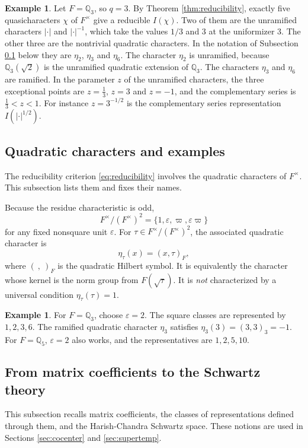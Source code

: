 \documentclass[12pt,letterpaper]{amsart}
\numberwithin{equation}{section}
\theoremstyle{definition}
\newtheorem{example}[theorem]{Example}
\newtheorem*{example*}{Example}
\theoremstyle{remark}
\begin{document}
\begin{example*}
Let $F=\mathbb Q_3$, so $q=3$. By Theorem \ref{thm:reducibility}, exactly five quasicharacters $\chi$ of $F^\times$ give a reducible $I(\chi)$. Two of them are the unramified characters $|\cdot|$ and $|\cdot|^{-1}$, which take the values $1/3$ and $3$ at the uniformizer $3$. The other three are the nontrivial quadratic characters. In the notation of Subsection \ref{sec:quad} below they are $\eta_2$, $\eta_3$ and $\eta_6$. The character $\eta_2$ is unramified, because $\mathbb Q_3(\sqrt2)$ is the unramified quadratic extension of $\mathbb Q_3$. The characters $\eta_3$ and $\eta_6$ are ramified. In the parameter $z$ of the unramified characters, the three exceptional points are $z=\tfrac13$, $z=3$ and $z=-1$, and the complementary series is $\tfrac13<z<1$. For instance $z=3^{-1/2}$ is the complementary series representation $I(|\cdot|^{1/2})$.
\end{example*}

\subsection{Quadratic characters and examples}\label{sec:quad}
The reducibility criterion \eqref{eq:reducibility} involves the quadratic characters of $F^\times$. This subsection lists them and fixes their names.

Because the residue characteristic is odd,
\begin{equation}\label{eq:squareclasses}
F^\times/(F^\times)^2=\{1,\varepsilon,\varpi,\varepsilon\varpi\}
\end{equation}
for any fixed nonsquare unit $\varepsilon$.  For $\tau\in F^\times/(F^\times)^2$, the associated quadratic character is
\begin{equation}\label{eq:hilbert}
\eta_\tau(x)=(x,\tau)_F,
\end{equation}
where $(\ ,\ )_F$ is the quadratic Hilbert symbol.  It is equivalently the character whose kernel is the norm group from $F(\sqrt\tau)$.  It is \emph{not} characterized by a universal condition $\eta_\tau(\tau)=1$.
\begin{example}
For $F=\mathbb Q_3$, choose $\varepsilon=2$. The square classes are represented by $1,2,3,6$.  The ramified quadratic character $\eta_3$ satisfies
$\eta_3(3)=(3,3)_3=-1$.  For $F=\mathbb Q_5$, $\varepsilon=2$ also works, and the representatives are $1,2,5,10$.
\end{example}


\subsection{From matrix coefficients to the Schwartz theory}\label{sec:schwartzbackground}
This subsection recalls matrix coefficients, the classes of representations defined through them, and the Harish-Chandra Schwartz space. These notions are used in Sections \ref{sec:cocenter} and \ref{sec:supertemp}.
\end{document}
